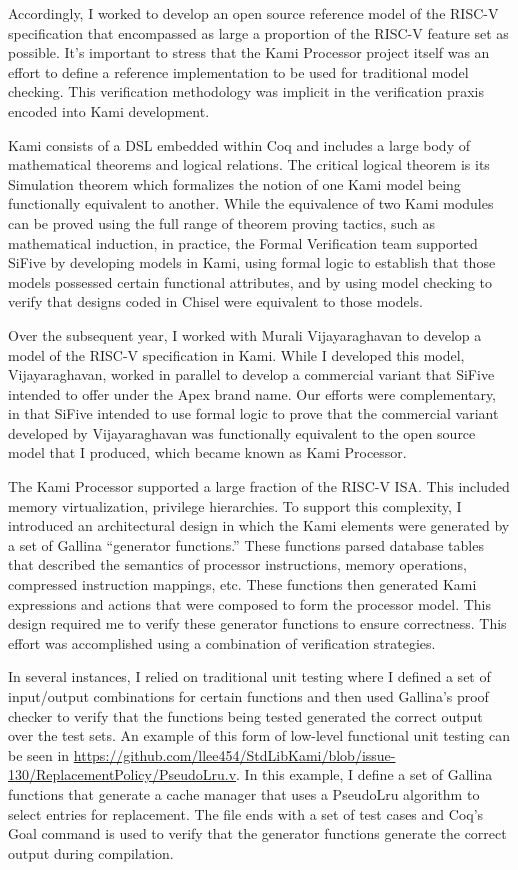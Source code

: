 \documentclass[10pt,a4paper]{article}
\begin{document}
Accordingly, I worked to develop an open source reference model of the RISC-V specification that encompassed as large a proportion of the RISC-V feature set as possible. It’s important to stress that the Kami Processor project itself was an effort to define a reference implementation to be used for traditional model checking. This verification methodology was implicit in the verification praxis encoded into Kami development.

Kami consists of a DSL embedded within Coq and includes a large body of mathematical theorems and logical relations. The critical logical theorem is its Simulation theorem which formalizes the notion of one Kami model being functionally equivalent to another. While the equivalence of two Kami modules can be proved using the full range of theorem proving tactics, such as mathematical induction, in practice, the Formal Verification team supported SiFive by developing models in Kami, using formal logic to establish that those models possessed certain functional attributes, and by using model checking to verify that designs coded in Chisel were equivalent to those models.

Over the subsequent year, I worked with Murali Vijayaraghavan to develop a model of the RISC-V specification in Kami. While I developed this model, Vijayaraghavan, worked in parallel to develop a commercial variant that SiFive intended to offer under the Apex brand name. Our efforts were complementary, in that SiFive intended to use formal logic to prove that the commercial variant developed by Vijayaraghavan was functionally equivalent to the open source model that I produced, which became known as Kami Processor.

The Kami Processor supported a large fraction of the RISC-V ISA. This included memory virtualization, privilege hierarchies. To support this complexity, I introduced an architectural design in which the Kami elements were generated by a set of Gallina “generator functions.” These functions parsed database tables that described the semantics of processor instructions, memory operations, compressed instruction mappings, etc. These functions then generated Kami expressions and actions that were composed to form the processor model. This design required me to verify these generator functions to ensure correctness. This effort was accomplished using a combination of verification strategies.

In several instances, I relied on traditional unit testing where I defined a set of input/output combinations for certain functions and then used Gallina’s proof checker to verify that the functions being tested generated the correct output over the test sets. An example of this form of low-level functional unit testing can be seen in \url{https://github.com/llee454/StdLibKami/blob/issue-130/ReplacementPolicy/PseudoLru.v}. In this example, I define a set of Gallina functions that generate a cache manager that uses a PseudoLru algorithm to select entries for replacement. The file ends with a set of test cases and Coq’s Goal command is used to verify that the generator functions generate the correct output during compilation. 
\end{document}
